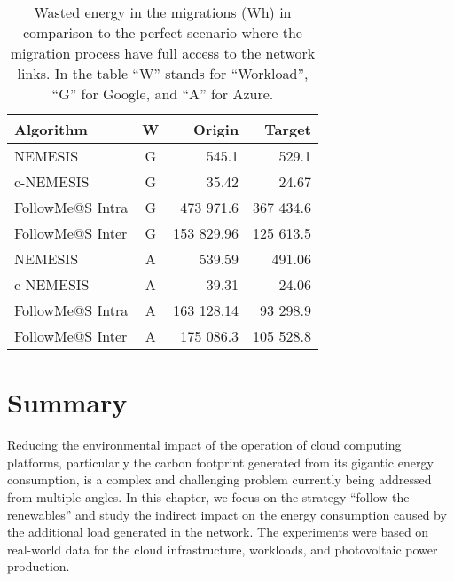 \begin{table}[!ht]

\caption{Wasted energy in the migrations (Wh) in comparison to the perfect scenario where the migration process have full access to the network links. In the table ``W'' stands for ``Workload'', ``G'' for Google, and ``A'' for Azure.}\label{tab:wasted_mig} \centering
\begin{tabular}{|l|c|r|r|}
  \hline
  \textbf{Algorithm} & \textbf{W}  & \textbf{Origin} & \textbf{Target}   \\
  \hline
  NEMESIS  & G & 545.1  & 529.1 \\
  \hline
  c-NEMESIS & G & 35.42  & 24.67 \\
  \hline
  FollowMe@S Intra & G & 473 971.6 & 367 434.6 \\
  \hline
  FollowMe@S Inter & G & 153 829.96  & 125 613.5  \\
  \hline
  NEMESIS  & A & 539.59  & 491.06 \\
  \hline
  c-NEMESIS & A &  39.31 & 24.06   \\
  \hline
  FollowMe@S Intra & A & 163 128.14  & 93 298.9  \\
  \hline
  FollowMe@S Inter & A & 175 086.3  & 105 528.8 \\
  \hline

\end{tabular}
\end{table}


\section{Summary} \label{sec:conclusion_smargreens}


Reducing the environmental impact of the operation of cloud computing platforms, particularly the carbon footprint generated from its gigantic energy consumption, is a complex and challenging problem currently being addressed from multiple angles. In this chapter, we focus on the strategy ``follow-the-renewables'' and study the indirect impact on the energy consumption caused by the additional load generated in the network. The experiments were based on real-world data for the cloud infrastructure, workloads, and photovoltaic power production.


